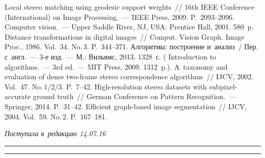 \begin{multicols}{2}
{\small\frenchspacing
 {%
 \begin{thebibliography}{9}
 Local stereo matching using 
geodesic support weights~// 16th IEEE Conference (International) on Image 
Processing.~--- IEEE Press, 2009. P.~2093--2096.
 Computer vision.~--- Upper Saddle River, NJ, 
USA: Prentice Hall, 2001. 580~p.
 Distance transformations in digital images~// Comput. Vision 
Graph. Image Proc., 1986. Vol.~34. No.\,3. P.~344--371.
 Алгоритмы: 
построение и~анализ~/ Пер. с~англ.~--- 3-е изд.~--- М.: Вильямс, 2013. 1328~с. 
( Introduction to 
algorithms.~--- 3rd ed.~--- MIT Press, 2009. 1312~p.).
 A~taxonomy and evaluation of dense two-frame 
stereo correspondence algorithms~// IJCV, 2002. Vol.~47. No.\,1/2/3. P.~7--42.
 High-resolution stereo datasets with  
subpixel-accurate ground truth~// German Conference on Pattern Recognition.~--- 
Springer, 2014. P.~31--42.
 Efficient graph-based image 
segmentation~// IJCV, 2004. Vol.~59. No.\,2. P.~167--181.
\end{thebibliography}

 }
 }

\end{multicols}


\hfill{\small\textit{Поступила в~редакцию 14.07.16}}

\vspace*{10pt}



\hrule

\vspace*{2pt}

\hrule

\vspace*{8pt}



\def\tit{SPEEDED-UP STEREO MATCHING USING~GEODESIC SUPPORT 
WEIGHTS}

